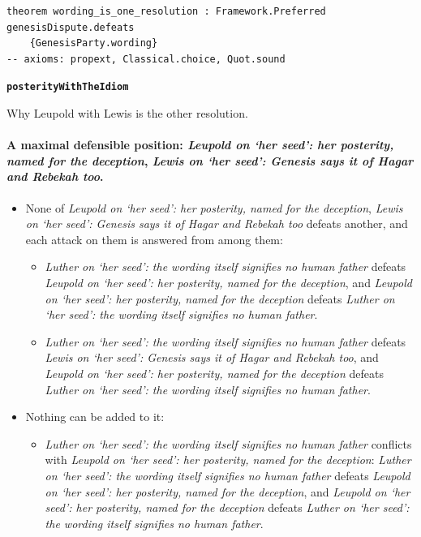 \documentclass[11pt]{article}
\begin{document}
{\small\begin{verbatim}
theorem wording_is_one_resolution : Framework.Preferred genesisDispute.defeats
    {GenesisParty.wording}
-- axioms: propext, Classical.choice, Quot.sound
\end{verbatim}}
\par\medskip\noindent\textbf{\texttt{posterity\allowbreak{}With\allowbreak{}The\allowbreak{}Idiom}}\par\nobreak\noindent
Why Leupold with Lewis is the other resolution.

\paragraph{A maximal defensible position: \emph{Leupold on ‘her seed’: her posterity, named for the deception}, \emph{Lewis on ‘her seed’: Genesis says it of Hagar and Rebekah too}.}
\begin{itemize}
\item None of \emph{Leupold on ‘her seed’: her posterity, named for the deception}, \emph{Lewis on ‘her seed’: Genesis says it of Hagar and Rebekah too} defeats another, and each attack on them is answered from among them:
\begin{itemize}
\item \emph{Luther on ‘her seed’: the wording itself signifies no human father} defeats \emph{Leupold on ‘her seed’: her posterity, named for the deception}, and \emph{Leupold on ‘her seed’: her posterity, named for the deception} defeats \emph{Luther on ‘her seed’: the wording itself signifies no human father}.
\item \emph{Luther on ‘her seed’: the wording itself signifies no human father} defeats \emph{Lewis on ‘her seed’: Genesis says it of Hagar and Rebekah too}, and \emph{Leupold on ‘her seed’: her posterity, named for the deception} defeats \emph{Luther on ‘her seed’: the wording itself signifies no human father}.
\end{itemize}
\item Nothing can be added to it:
\begin{itemize}
\item \emph{Luther on ‘her seed’: the wording itself signifies no human father} conflicts with \emph{Leupold on ‘her seed’: her posterity, named for the deception}: \emph{Luther on ‘her seed’: the wording itself signifies no human father} defeats \emph{Leupold on ‘her seed’: her posterity, named for the deception}, and \emph{Leupold on ‘her seed’: her posterity, named for the deception} defeats \emph{Luther on ‘her seed’: the wording itself signifies no human father}.
\end{itemize}
\end{itemize}
\end{document}
